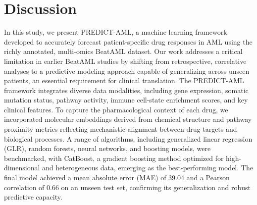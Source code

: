 \documentclass[pdflatex,sn-mathphys-num]{sn-jnl}%
\theoremstyle{thmstyleone}%
\theoremstyle{thmstyletwo}%
\theoremstyle{thmstylethree}%
\begin{document}
\section{Discussion}\label{sec4}
In this study, we present PREDICT-AML, a machine learning framework developed to accurately forecast patient-specific drug responses in AML using the richly annotated, multi-omics BeatAML dataset. 
Our work addresses a critical limitation in earlier BeatAML studies by shifting from retrospective, correlative analyses to a predictive modeling approach capable of generalizing across unseen patients, an essential requirement for clinical translation. 
The PREDICT-AML framework integrates diverse data modalities, including gene expression, somatic mutation status, pathway activity, immune cell-state enrichment scores, and key clinical features. 
To capture the pharmacological context of each drug, we incorporated molecular embeddings derived from chemical structure and pathway proximity metrics reflecting mechanistic alignment between drug targets and biological processes. 
A range of algorithms, including generalized linear regression (GLR), random forests, neural networks, and boosting models, were benchmarked, with CatBoost, a gradient boosting method optimized for high-dimensional and heterogeneous data, emerging as the best-performing model. 
The final model achieved a mean absolute error (MAE) of 39.04 and a Pearson correlation of 0.66 on an unseen test set, confirming its generalization and robust predictive capacity.
\end{document}
